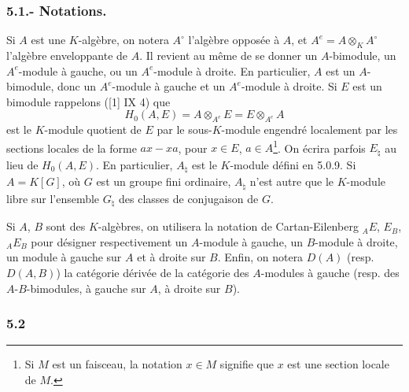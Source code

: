 \subsubsection*{5.1.- Notations.}

Si $A$ est une $K$-algèbre, on notera $A^\circ$ l'algèbre opposée à $A$, et $A^e=A\otimes_KA^\circ$ l'algèbre enveloppante de $A$. Il revient au même de se donner un $A$-bimodule, un $A^e$-module à gauche, ou un $A^e$-module à droite. En particulier, $A$ est un $A$-bimodule, donc un $A^e$-module à gauche et un $A^e$-module à droite. Si $E$ est un bimodule rappelons ([1] IX 4) que
\[
H_0(A,E)=A\otimes_{A^e}E=E\otimes_{A^e}A
\]
est le $K$-module quotient de $E$ par le sous-$K$-module engendré localement par les sections locales de la forme $ax-xa$, pour $x\in E$, $a\in A$\footnote{Si $M$ est un faisceau, la notation $x\in M$ signifie que $x$ est une section locale de $M$.}. On écrira parfois $E_\natural$ au lieu de $H_0(A,E)$. En particulier, $A_\natural$ est le $K$-module défini en 5.0.9. Si $A=K[G]$, où $G$ est un groupe fini ordinaire, $A_\natural$ n'est autre que le $K$-module libre sur l'ensemble $G_\natural$ des classes de conjugaison de $G$.

Si $A$, $B$ sont des $K$-algèbres, on utilisera la notation de Cartan-Eilenberg ${}_AE$, $E_B$, ${}_AE_B$ pour désigner respectivement un $A$-module à gauche, un $B$-module à droite, un module à gauche sur $A$ et à droite sur $B$. Enfin, on notera $D(A)$ (resp. $D(A,B)$) la catégorie dérivée de la catégorie des $A$-modules à gauche (resp. des $A$-$B$-bimodules, à gauche sur $A$, à droite sur $B$).

\subsubsection*{5.2}


